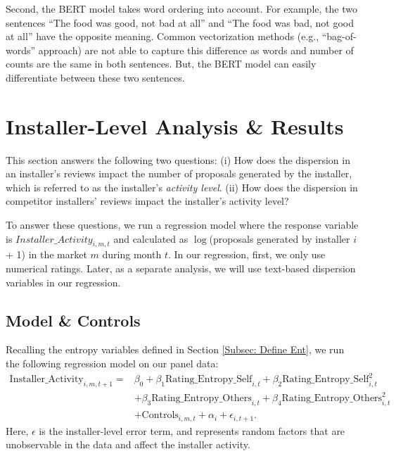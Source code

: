 \documentclass[msom,blindrev]{informs3}
\begin{document}
Second, the BERT model takes word ordering into account. For example, the two sentences ``The food was good, not bad at all'' and ``The food was bad, not good at all'' have the opposite meaning. Common vectorization methods (e.g., ``bag-of-words'' approach) are not able to capture this difference as words and number of counts are the same in both sentences. But, the BERT model can easily differentiate between these two sentences.


\section{Installer-Level Analysis \& Results} \label{Sec: Installer-level}

This section answers the following two questions: (i) How does the dispersion in an installer's reviews impact the  number of proposals generated by the installer, which is referred to as the installer's \emph{activity level}. (ii) How does the dispersion in competitor installers' reviews impact the installer's activity level?

To answer these questions, we run a regression model where the response variable is $Installer\_Activity_{i,m,t}$ and calculated as $\log$(proposals generated by installer $i$ + 1) in the market $m$ during month $t$. In our regression, first, we only use numerical ratings. Later, as a separate analysis, we will use text-based dispersion variables in our regression.

\subsection{Model \& Controls}

Recalling the entropy variables defined in Section \ref{Subsec: Define Ent}, we run the following regression model on our panel data:
\begin{align}  \nonumber
    \text{Installer\_Activity}_{i,m,t+1}=&\beta_{0}+\beta_{1} \text{Rating\_Entropy\_Self}_{i,t}+\beta_{2} \text{Rating\_Entropy\_Self}_{i,t}^ {2}
    \\ \nonumber
    &+\beta_{3} \text{Rating\_Entropy\_Others}_{i,t}  +\beta_{4}\text{Rating\_Entropy\_Others}_{i,t}^{2} \\ \label{model_ind_3}
    &+ \text{Controls}_{i,m,t}+ \alpha_{i} + \epsilon_{i,t+1}.
\end{align}
 Here, $\epsilon$ is the installer-level error term, and represents random factors that are unobservable in the data and affect the installer activity.
\end{document}
